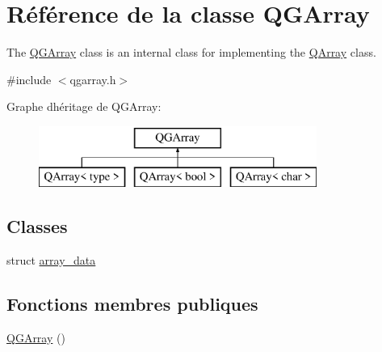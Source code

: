 \hypertarget{class_q_g_array}{}\section{Référence de la classe Q\+G\+Array}
\label{class_q_g_array}


The \hyperlink{class_q_g_array}{Q\+G\+Array} class is an internal class for implementing the \hyperlink{class_q_array}{Q\+Array} class.  




{\ttfamily \#include $<$qgarray.\+h$>$}

Graphe d\textquotesingle{}héritage de Q\+G\+Array\+:\begin{figure}[H]
\begin{center}
\leavevmode
\includegraphics[height=2.000000cm]{class_q_g_array}
\end{center}
\end{figure}
\subsection*{Classes}
\begin{DoxyCompactItemize}
\item 
struct \hyperlink{struct_q_g_array_1_1array__data}{array\+\_\+data}
\end{DoxyCompactItemize}
\subsection*{Fonctions membres publiques}
\begin{DoxyCompactItemize}
\item 
\hyperlink{class_q_g_array_a340abca11ce20f6c827f453216c4ad4f}{Q\+G\+Array} ()
\end{DoxyCompactItemize}
